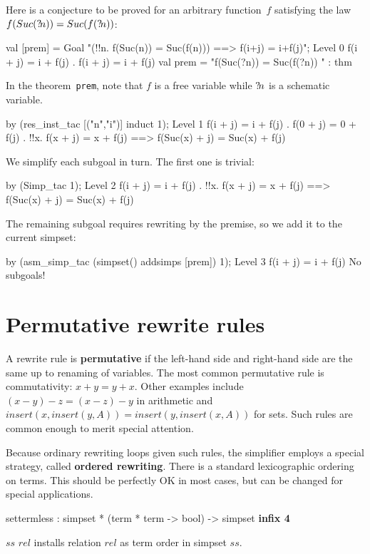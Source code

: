 Here is a conjecture to be proved for an arbitrary function~$f$
satisfying the law $f(Suc({?\!n})) = Suc(f({?\!n}))$:
\begin{ttbox}
val [prem] = Goal
               "(!!n. f(Suc(n)) = Suc(f(n))) ==> f(i+j) = i+f(j)";
{\out Level 0}
{\out f(i + j) = i + f(j)}
{. f(i + j) = i + f(j)}
\ttbreak
{\out val prem = "f(Suc(?n)) = Suc(f(?n))}
{\out             [!!n. f(Suc(n)) = Suc(f(n))]" : thm}
\end{ttbox}
In the theorem~\texttt{prem}, note that $f$ is a free variable while
${?\!n}$ is a schematic variable.
\begin{ttbox}
by (res_inst_tac [("n","i")] induct 1);
{\out Level 1}
{\out f(i + j) = i + f(j)}
{. f(0 + j) = 0 + f(j)}
{. !!x. f(x + j) = x + f(j) ==> f(Suc(x) + j) = Suc(x) + f(j)}
\end{ttbox}
We simplify each subgoal in turn.  The first one is trivial:
\begin{ttbox}
by (Simp_tac 1);
{\out Level 2}
{\out f(i + j) = i + f(j)}
{. !!x. f(x + j) = x + f(j) ==> f(Suc(x) + j) = Suc(x) + f(j)}
\end{ttbox}
The remaining subgoal requires rewriting by the premise, so we add it
to the current simpset:
\begin{ttbox}
by (asm_simp_tac (simpset() addsimps [prem]) 1);
{\out Level 3}
{\out f(i + j) = i + f(j)}
{\out No subgoals!}
\end{ttbox}


\section{Permutative rewrite rules}

A rewrite rule is {\bf permutative} if the left-hand side and right-hand
side are the same up to renaming of variables.  The most common permutative
rule is commutativity: $x+y = y+x$.  Other examples include $(x-y)-z =
(x-z)-y$ in arithmetic and $insert(x,insert(y,A)) = insert(y,insert(x,A))$
for sets.  Such rules are common enough to merit special attention.

Because ordinary rewriting loops given such rules, the simplifier
employs a special strategy, called {\bf ordered
  rewriting}.  There is a standard
lexicographic ordering on terms.  This should be perfectly OK in most
cases, but can be changed for special applications.

\begin{ttbox}
settermless : simpset * (term * term -> bool) -> simpset \hfill{\bf infix 4}
\end{ttbox}
\begin{ttdescription}
  
\item[$ss$ \ttindexbold{settermless} $rel$] installs relation $rel$ as
  term order in simpset $ss$.

\end{ttdescription}

